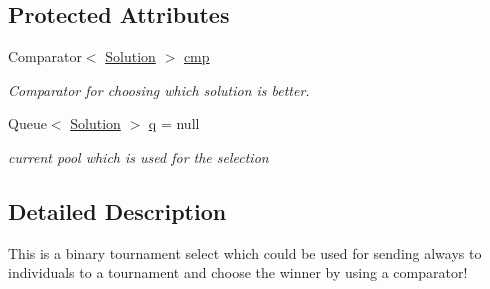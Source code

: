 \subsection*{Protected Attributes}
\begin{DoxyCompactItemize}
\item 
\hypertarget{classcom_1_1msu_1_1moo_1_1operators_1_1selection_1_1BinaryTournamentSelection_ad167c5ef80c4ad0a0f1741bea8be5117}{Comparator$<$ \hyperlink{classcom_1_1msu_1_1moo_1_1model_1_1solution_1_1Solution}{Solution} $>$ \hyperlink{classcom_1_1msu_1_1moo_1_1operators_1_1selection_1_1BinaryTournamentSelection_ad167c5ef80c4ad0a0f1741bea8be5117}{cmp}}\label{classcom_1_1msu_1_1moo_1_1operators_1_1selection_1_1BinaryTournamentSelection_ad167c5ef80c4ad0a0f1741bea8be5117}

\begin{DoxyCompactList}\small\item\em Comparator for choosing which solution is better. \end{DoxyCompactList}\item 
\hypertarget{classcom_1_1msu_1_1moo_1_1operators_1_1selection_1_1BinaryTournamentSelection_a1df311edb47efc73fc8401436c821168}{Queue$<$ \hyperlink{classcom_1_1msu_1_1moo_1_1model_1_1solution_1_1Solution}{Solution} $>$ \hyperlink{classcom_1_1msu_1_1moo_1_1operators_1_1selection_1_1BinaryTournamentSelection_a1df311edb47efc73fc8401436c821168}{q} = null}\label{classcom_1_1msu_1_1moo_1_1operators_1_1selection_1_1BinaryTournamentSelection_a1df311edb47efc73fc8401436c821168}

\begin{DoxyCompactList}\small\item\em current pool which is used for the selection \end{DoxyCompactList}\end{DoxyCompactItemize}


\subsection{Detailed Description}
This is a binary tournament select which could be used for sending always to individuals to a tournament and choose the winner by using a comparator! 

